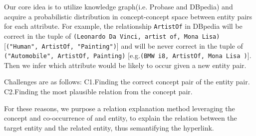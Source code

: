 Our core idea is to utilize knowledge graph(i.e. \ac{Probase} and \ac{DBpedia}) and acquire a probabilistic distribution in concept-concept space between entity pairs for each attribute. 
For example, the relationship {\tt ArtistOf} in \ac{DBpedia} will be correct in the tuple of {\tt(Leonardo Da Vinci, artist of, Mona Lisa)} [{\tt("Human", ArtistOf, "Painting")}] and will be never correct in the tuple of {\tt ("Automobile", ArtistOf, Painting)} [e.g.{\tt(BMW i8, ArtistOf, Mona Lisa )}]. 
Then we infer which attribute would be likely to occur given a new entity pair. 

Challenges are as follows: 
C1.Finding the correct concept pair of the entity pair.
C2.Finding the most plausible relation from the concept pair.




For these reasons, we purpose a relation explanation method leveraging the concept and co-occurrence of and entity, to explain the relation between the target entity and the related entity, thus semantifying the hyperlink.
